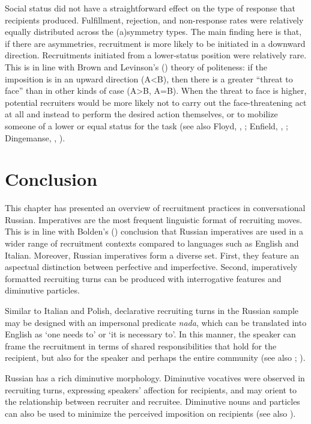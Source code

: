 \documentclass[output=paper,modfonts,nonflat]{langsci/langscibook}
\begin{document}
Social status did not have a straightforward effect on the type of response that recipients produced. Fulfillment, rejection, and non-response rates were relatively equally distributed across the (a)symmetry types. The main finding here is that, if there are asymmetries, recruitment is more likely to be initiated in a downward direction. Recruitments initiated from a lower-status position were relatively rare. This is in line with Brown and Levinson’s (\citeyear{BrownLevinson1987}) theory of politeness: if the imposition is in an upward direction (A<B), then there is a greater “threat to face” than in other kinds of case (A>B, A=B). When the threat to face is higher, potential recruiters would be more likely not to carry out the face-threatening act at all and instead to perform the desired action themselves, or to mobilize someone of a lower or equal status for the task (see also Floyd, , ; Enfield, , ; Dingemanse, , ).

\section{Conclusion}

This chapter has presented an overview of recruitment practices in conversational Russian. Imperatives are the most frequent linguistic format of recruiting moves. This is in line with Bolden’s (\citeyear{bolden2017}) conclusion that Russian imperatives are used in a wider range of recruitment contexts compared to languages such as English and Italian. Moreover, Russian imperatives form a diverse set. First, they feature an aspectual distinction between perfective and imperfective. Second, imperatively formatted recruiting turns can be produced with interrogative features and diminutive particles.

Similar to Italian and Polish, declarative recruiting turns in the Russian sample may be designed with an impersonal predicate \textit{nada}, which can be translated into English as ‘one needs to’ or ‘it is necessary to’. In this manner, the speaker can frame the recruitment in terms of shared responsibilities that hold for the recipient, but also for the speaker and perhaps the entire community (see also \citealt{ZinkenOgiermann2011}; \citealt[chap. 6]{Zinken2016}).

Russian has a rich diminutive morphology. Diminutive vocatives were observed in recruiting turns, expressing speakers’ affection for recipients, and may orient to the relationship between recruiter and recruitee. Diminutive nouns and particles can also be used to minimize the perceived imposition on recipients (see also \citealt{bolden2017}).
\end{document}
